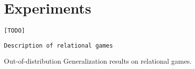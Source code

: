 \section{Experiments}\label{sec:experiments}

\texttt{[TODO]}

\texttt{Description of relational games}

\begin{table}
    \centering
    
    \caption{Out-of-distribution Generalization results on relational games.}
\end{table}
